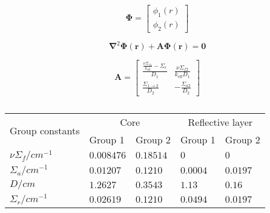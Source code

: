 \begin{equation}
    \pmb{\Phi} = \begin{bmatrix}
        \phi_1(r) \\
        \phi_2(r)
    \end{bmatrix}
\end{equation}

\begin{equation}
    \pmb{\nabla}^2\pmb{\Phi}(\pmb{r})+\pmb{A}\pmb{\Phi}(\pmb{r}) = \pmb{0}
\end{equation}

\begin{equation}
    \pmb{A} = \begin{bmatrix}
        \frac{\frac{\nu\Sigma_{f1}}{k_\mathrm{eff}}-\Sigma_r}{D_1} & \frac{\nu\Sigma_{f2}}{k_\mathrm{eff}D_1} \\
        \frac{\Sigma_{1\rightarrow2}}{D_2} & -\frac{\Sigma_{a2}}{D_2}
    \end{bmatrix}
\end{equation}

\begin{table}[H]
    \centering
    \caption{}
    \label{tab:}
    \begin{tabular}{lllll}
    \toprule
    \multirow{2}{*}{Group constants} & \multicolumn{2}{c}{Core} & \multicolumn{2}{c}{Reflective layer} \\
    \cmidrule(lr){2-3}\cmidrule(lr){4-5}
     & Group 1 & Group 2 & Group 1 & Group 2 \\
    \midrule
    $\nu\Sigma_f/\si{cm^{-1}}$ & $0.008476$ & $0.18514$ & $0$ & $0$ \\
    $\Sigma_a/\si{cm^{-1}}$ & $0.01207$ & $0.1210$ & $0.0004$ & $0.0197$ \\
    $D/\si{cm}$ & $1.2627$ & $0.3543$ & $1.13$ & $0.16$ \\
    $\Sigma_r/\si{cm^{-1}}$ & $0.02619$ & $0.1210$ & $0.0494$ & $0.0197$ \\
    \bottomrule
    \end{tabular}
\end{table}
